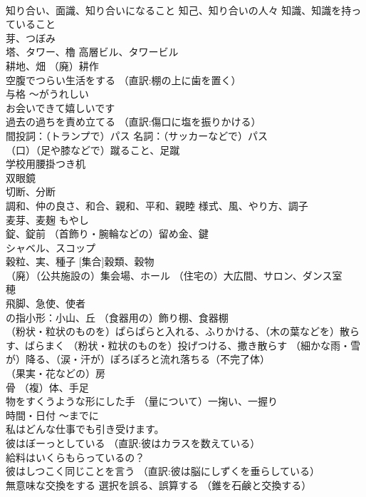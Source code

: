 \documentclass[8pt]{extreport}
\begin{document}
\begin{CJK}{UTF8}{min}
\\	知り合い、面識、知り合いになること 知己、知り合いの人々 知識、知識を持っていること
\\	芽、つぼみ
\\	塔、タワー、櫓 高層ビル、タワービル
\\	耕地、畑 （廃）耕作
\\	空腹でつらい生活をする （直訳:棚の上に歯を置く）
\\	与格	〜がうれしい
\\	お会いできて嬉しいです
\\	過去の過ちを責め立てる （直訳:傷口に塩を振りかける）
\\	間投詞：（トランプで）パス 名詞：（サッカーなどで）パス
\\	（口）（足や膝などで）蹴ること、足蹴
\\	学校用腰掛つき机
\\	双眼鏡
\\	切断、分断
\\	調和、仲の良さ、和合、親和、平和、親睦 様式、風、やり方、調子
\\	麦芽、麦麹 もやし
\\	錠、錠前 （首飾り・腕輪などの）留め金、鍵
\\	シャベル、スコップ
\\	穀粒、実、種子 [集合]穀類、穀物
\\	（廃）（公共施設の）集会場、ホール （住宅の）大広間、サロン、ダンス室
\\	穂
\\	飛脚、急使、使者
\\	の指小形：小山、丘 （食器用の）飾り棚、食器棚
\\	（粉状・粒状のものを）ぱらぱらと入れる、ふりかける、（木の葉などを）散らす、ばらまく （粉状・粒状のものを）投げつける、撒き散らす （細かな雨・雪が）降る、（涙・汗が）ぽろぽろと流れ落ちる（不完了体）
\\	（果実・花などの）房
\\	骨 （複）体、手足
\\	物をすくうような形にした手 （量について）一掬い、一握り
\\	時間・日付	〜までに
\\	私はどんな仕事でも引き受けます。
\\	彼はぼーっとしている （直訳:彼はカラスを数えている）
\\	給料はいくらもらっているの？
\\	彼はしつこく同じことを言う （直訳:彼は脳にしずくを垂らしている）
\\	無意味な交換をする 選択を誤る、誤算する （錐を石鹸と交換する）

\end{CJK}
\end{document}
